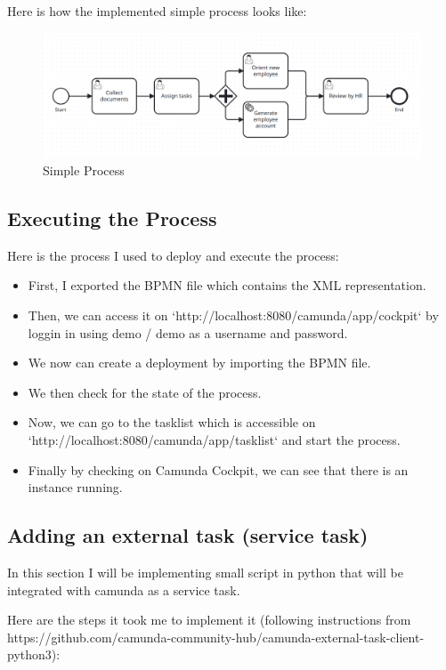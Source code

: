 \documentclass[12pt]{article}
\begin{document}
{  Here is how the implemented simple process looks like:

  \begin{figure}[h]
    \centering
    \includegraphics[width=.90\linewidth]{simple_process.png}
    \caption{Simple Process}
    \label{fig:simple_process}
  \end{figure}

  \subsection{Executing the Process}

  Here is the process I used to deploy and execute the process:

  \begin{itemize}[noitemsep,nolistsep]
    \item First, I exported the BPMN file which contains the XML representation.
    \item Then, we can access it on `http://localhost:8080/camunda/app/cockpit` by loggin in using demo / demo as a username and password.
    \item We now can create a deployment by importing the BPMN file.
    \item We then check for the state of the process.
    \item Now, we can go to the tasklist which is accessible on `http://localhost:8080/camunda/app/tasklist` and start the process.
    \item Finally by checking on Camunda Cockpit, we can see that there is an instance running.
  \end{itemize}

  \subsection{Adding an external task (service task)}

  In this section I will be implementing small script in python that will be integrated with camunda as a service task.

  Here are the steps it took me to implement it (following instructions from https://github.com/camunda-community-hub/camunda-external-task-client-python3):

}
\end{document}
